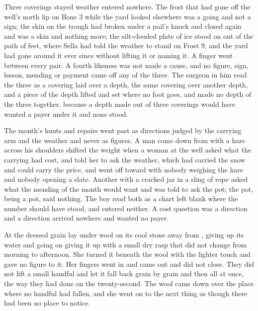 Three coverings stayed weather entered nowhere. The frost that had gone off the well's north lip on Bone 3 while the yard looked elsewhere was a going and not a sign; the skin on the trough had broken under a pail's knock and closed again and was a skin and nothing more; the silt-clouded plate of ice stood on  out of the path of feet, where Sella had told the weather to stand on Frost 9, and the yard had gone around it ever since without lifting it or naming it. A finger went between every pair. A fourth likeness was not made a cause, and no figure, sign, lesson, mending or payment came off any of the three. The surgeon in him read the three as a covering laid over a depth, the same covering over another depth, and a piece of the depth lifted and set where no foot goes, and made no depth of the three together, because a depth made out of three coverings would have wanted a payer under it and none stood.

The month's hunts and repairs went past as directions judged by the carrying arm and the weather and never as figures. A man come down from  with a hare across his shoulders shifted the weight when a woman at the well asked what the carrying had cost, and told her to ask the weather, which had carried the snow and could carry the price, and went off toward  with nobody weighing the hare and nobody opening a slate. Another with a cracked jar in a sling of rope asked what the mending of the month would want and was told to ask the pot; the pot, being a pot, said nothing. The boy read both as a chart left blank where the number should have stood, and entered neither. A cost question was a direction and a direction arrived nowhere and wanted no payer.

\scenebreak

At  the dressed grain lay under wool on its cool stone away from , giving up its water and going on giving it up with a small dry rasp that did not change from morning to afternoon. She turned it beneath the wool with the lighter touch and gave no figure to it. Her fingers went in and came out and did not close. They did not lift a small handful and let it fall back grain by grain and then all at once, the way they had done on the twenty-second. The wool came down over the place where no handful had fallen, and she went on to the next thing as though there had been no place to notice.

